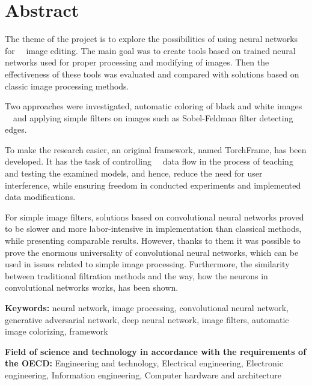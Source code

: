 \section*{Abstract}

  The theme of the project is to explore the possibilities of using neural networks for
  image editing. The main goal was to create tools based on
  trained neural networks used for proper processing and modifying of
  images. Then the effectiveness of these tools was evaluated and
  compared with solutions based on classic image processing methods.

  Two approaches were investigated, automatic coloring of black and white images
  and applying simple filters on images such as Sobel-Feldman filter detecting edges.

  To make the research easier, an original framework, named TorchFrame, has been developed.
  It has the task of controlling
  data flow in the process of teaching and testing the examined models, and hence,
  reduce the need for user interference, while ensuring freedom
  in conducted experiments and implemented data modifications.

  For simple image filters, solutions based on convolutional neural networks proved to
  be slower and more labor-intensive in implementation than classical methods,
  while presenting comparable results.
  However, thanks to them it was possible to prove the enormous universality
  of convolutional neural networks, which can be used in issues related to
  simple image processing. Furthermore, the similarity between traditional filtration
  methods and the way, how the neurons in convolutional networks works, has been shown.

  \bigskip

  \noindent\textbf{Keywords:} neural network, image processing, convolutional
  neural network, generative adversarial network, deep neural network,
  image filters, automatic image colorizing, framework

  \bigskip

  \noindent\textbf{Field of science and technology in accordance with the
  requirements of the OECD:} Engineering and technology, Electrical engineering,
  Electronic engineering, Information engineering, Computer hardware and
  architecture
